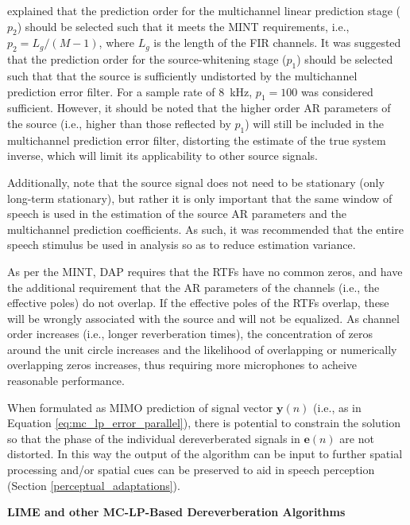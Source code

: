 \cite{triki2006delay} explained that the prediction order for the multichannel linear prediction stage ($p_2$) should be selected such that it meets the MINT requirements, i.e., $p_2=L_g/(M-1)$, where $L_g$ is the length of the FIR channels. It was suggested that the prediction order for the source-whitening stage ($p_1$) should be selected such that that the source is sufficiently undistorted by the multichannel prediction error filter. For a sample rate of \qty{8}{\kilo\hertz}, $p_1=100$ was considered sufficient. However, it should be noted that the higher order AR parameters of the source (i.e., higher than those reflected by $p_1$) will still be included in the multichannel prediction error filter, distorting the estimate of the true system inverse, which will limit its applicability to other source signals.

Additionally, note that the source signal does not need to be stationary (only long-term stationary), but rather it is only important that the same window of speech is used in the estimation of the source AR parameters and the multichannel prediction coefficients. As such, it was recommended that the entire speech stimulus be used in analysis so as to reduce estimation variance.

As per the MINT, DAP requires that the RTFs have no common zeros, and have the additional requirement that the AR parameters of the channels (i.e., the effective poles) do not overlap. If the effective poles of the RTFs overlap, these will be wrongly associated with the source and will not be equalized. As channel order increases (i.e., longer reverberation times), the concentration of zeros around the unit circle increases and the likelihood of overlapping or numerically overlapping zeros increases, thus requiring more microphones to acheive reasonable performance. 

When formulated as MIMO prediction of signal vector $\boldsymbol{y}(n)$ (i.e., as in Equation \ref{eq:mc_lp_error_parallel}), there is potential to constrain the solution so that the phase of the individual dereverberated signals in $\boldsymbol{e}(n)$ are not distorted. In this way the output of the algorithm can be input to further spatial processing and/or spatial cues can be preserved to aid in speech perception (Section \ref{perceptual_adaptations}).

\noindent
\newline
\textbf{LIME and other MC-LP-Based Dereverberation Algorithms} \label{section:other_mc_lp_approaches}

